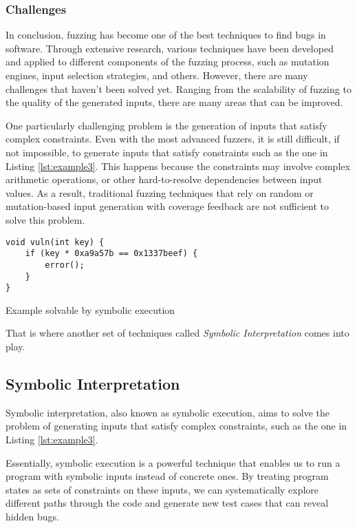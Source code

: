 \subsubsection{Challenges}

In conclusion, fuzzing has become one of the best techniques to find bugs in software. Through extensive research, various techniques have been developed and applied to different components of the fuzzing process, such as mutation engines, input selection strategies, and others. However, there are many challenges that haven't been solved yet. Ranging from the scalability of fuzzing to the quality of the generated inputs, there are many areas that can be improved.

One particularly challenging problem is the generation of inputs that satisfy complex constraints. Even with the most advanced fuzzers, it is still difficult, if not impossible, to generate inputs that satisfy constraints such as the one in Listing \ref{lst:example3}. This happens because the constraints may involve complex arithmetic operations, or other hard-to-resolve dependencies between input values. As a result, traditional fuzzing techniques that rely on random or mutation-based input generation with coverage feedback are not sufficient to solve this problem.

\begin{listing}[htp]
	\centering
	\begin{minipage}{.6\linewidth}
		\begin{verbatim}
void vuln(int key) {
	if (key * 0xa9a57b == 0x1337beef) {
		error();
	}
}
		\end{verbatim}
	\end{minipage}
	\caption{Example solvable by symbolic execution}
	\label{lst:example3}
\end{listing}

That is where another set of techniques called \textit{Symbolic Interpretation} comes into play.

\subsection{Symbolic Interpretation}

Symbolic interpretation, also known as symbolic execution, aims to solve the problem of generating inputs that satisfy complex constraints, such as the one in Listing \ref{lst:example3}.

Essentially, symbolic execution is a powerful technique that enables us to run a program with symbolic inputs instead of concrete ones. By treating program states as sets of constraints on these inputs, we can systematically explore different paths through the code and generate new test cases that can reveal hidden bugs.

